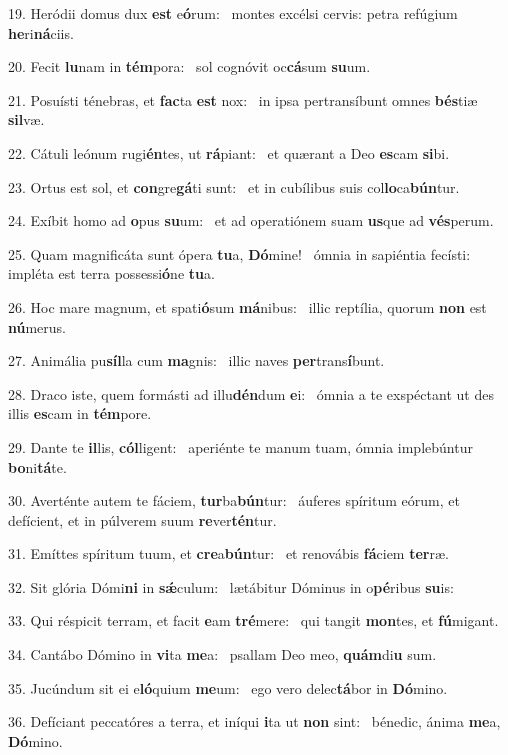 19. Heródii domus dux \textbf{est} e\textbf{ó}rum: \ast\  montes excélsi cervis: petra refúgium \textbf{he}ri\textbf{ná}ciis.\

20. Fecit \textbf{lu}nam in \textbf{tém}pora: \ast\  sol cognóvit oc\textbf{cá}sum \textbf{su}um.\

21. Posuísti ténebras, et \textbf{fac}ta \textbf{est} nox: \ast\  in ipsa pertransíbunt omnes \textbf{bés}tiæ \textbf{sil}væ.\

22. Cátuli leónum rugi\textbf{én}tes, ut \textbf{rá}piant: \ast\  et quærant a Deo \textbf{es}cam \textbf{si}bi.\

23. Ortus est sol, et \textbf{con}gre\textbf{gá}ti sunt: \ast\  et in cubílibus suis col\textbf{lo}ca\textbf{bún}tur.\

24. Exíbit homo ad \textbf{o}pus \textbf{su}um: \ast\  et ad operatiónem suam \textbf{us}que ad \textbf{vés}perum.\

25. Quam magnificáta sunt ópera \textbf{tu}a, \textbf{Dó}mine! \ast\  ómnia in sapiéntia fecísti: impléta est terra possessi\textbf{ó}ne \textbf{tu}a.\

26. Hoc mare magnum, et spati\textbf{ó}sum \textbf{má}nibus: \ast\  illic reptília, quorum \textbf{non} est \textbf{nú}merus.\

27. Animália pu\textbf{síl}la cum \textbf{ma}gnis: \ast\  illic naves \textbf{per}trans\textbf{í}bunt.\

28. Draco iste, quem formásti ad illu\textbf{dén}dum \textbf{e}i: \ast\  ómnia a te exspéctant ut des illis \textbf{es}cam in \textbf{tém}pore.\

29. Dante te \textbf{il}lis, \textbf{cól}ligent: \ast\  aperiénte te manum tuam, ómnia implebúntur \textbf{bo}ni\textbf{tá}te.\

30. Averténte autem te fáciem, \textbf{tur}ba\textbf{bún}tur: \ast\  áuferes spíritum eórum, et defícient, et in púlverem suum \textbf{re}ver\textbf{tén}tur.\

31. Emíttes spíritum tuum, et \textbf{cre}a\textbf{bún}tur: \ast\  et renovábis \textbf{fá}ciem \textbf{ter}ræ.\

32. Sit glória Dómi\textbf{ni} in \textbf{sǽ}culum: \ast\  lætábitur Dóminus in o\textbf{pé}ribus \textbf{su}is:\

33. Qui réspicit terram, et facit \textbf{e}am \textbf{tré}mere: \ast\  qui tangit \textbf{mon}tes, et \textbf{fú}migant.\

34. Cantábo Dómino in \textbf{vi}ta \textbf{me}a: \ast\  psallam Deo meo, \textbf{quám}di\textbf{u} sum.\

35. Jucúndum sit ei e\textbf{ló}quium \textbf{me}um: \ast\  ego vero delec\textbf{tá}bor in \textbf{Dó}mino.\

36. Defíciant peccatóres a terra, et iníqui \textbf{i}ta ut \textbf{non} sint: \ast\  bénedic, ánima \textbf{me}a, \textbf{Dó}mino.\

